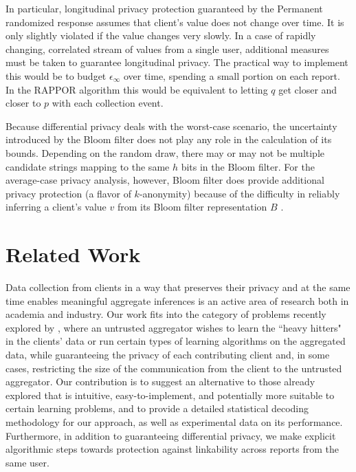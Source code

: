 \documentclass{sig-alternate-2013}
\newcommand\RAPPOR{{RAPPOR}}
\begin{document}
In particular, longitudinal privacy protection guaranteed by the Permanent randomized response assumes that client's value does not change over time. It is only slightly violated if the value changes very slowly. In a case of rapidly changing, correlated stream of values from a single user, additional measures must be taken to guarantee longitudinal privacy. The practical way to implement this would be to budget $\epsilon_{\infty}$ over time, spending a small portion on each report. In the \RAPPOR{} algorithm this would be equivalent to letting $q$ get closer and closer to $p$ with each collection event.

Because differential privacy deals with the worst-case scenario, the uncertainty introduced by the Bloom filter does not play any role in the calculation of its bounds. Depending on the random draw, there may or may not be multiple candidate strings mapping to the same $h$ bits in the Bloom filter. For the average-case privacy analysis, however, Bloom filter does provide additional privacy protection (a flavor of $k$-anonymity) because of the difficulty in reliably inferring a client's value $v$ from its Bloom filter representation $B$ \citep{bloom_privacy}.


\section{Related Work}
Data collection from clients in a way that preserves their privacy and at the same time enables meaningful aggregate inferences is an active area of research both in academia and industry.
Our work fits into the category of problems recently explored by \cite{Hsu2012, SafeZones, Chan2012, Liu2012}, where an untrusted aggregator wishes to learn the ``heavy hitters" in the clients' data or run certain types of learning algorithms on the aggregated data, while guaranteeing the privacy of each contributing client and, in some cases, restricting the size of the communication from the client to the untrusted aggregator. Our contribution is to suggest an alternative to those already explored that is intuitive, easy-to-implement, and potentially more suitable to certain learning problems, and to provide a detailed statistical decoding methodology for our approach, as well as experimental data on its performance. Furthermore, in addition to guaranteeing differential privacy, we make explicit algorithmic steps towards protection against linkability across reports from the same user.
\end{document}
